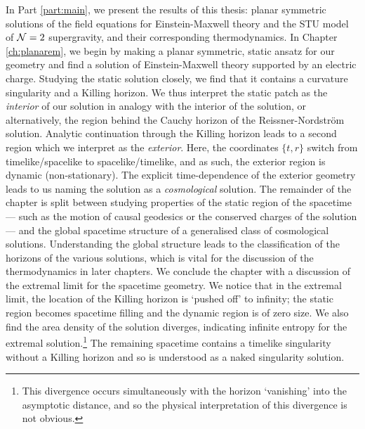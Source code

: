 In Part \ref{part:main}, we present the results of this thesis: planar symmetric solutions of the field equations for Einstein-Maxwell theory and the STU model of ${\cal N} = 2$ supergravity, and their corresponding thermodynamics. In Chapter \ref{ch:planarem}, we begin by making a planar symmetric, static ansatz for our geometry and find a solution of Einstein-Maxwell theory supported by an electric charge. Studying the static solution closely, we find that it contains a curvature singularity and a Killing horizon. We thus interpret the static patch as the \emph{interior} of our solution in analogy with the interior of the \sch solution, or alternatively, the region behind the Cauchy horizon of the Reissner-Nordstr\"om solution. Analytic continuation through the Killing horizon leads to a second region which we interpret as the \emph{exterior}. Here, the coordinates $\{t,r\}$ switch from timelike/spacelike to spacelike/timelike, and as such, the exterior region is dynamic (non-stationary). The explicit time-dependence of the exterior geometry leads to us naming the solution as a \emph{cosmological} solution. The remainder of the chapter is split between studying properties of the static region of the spacetime --- such as the motion of causal geodesics or the conserved charges of the solution --- and the global spacetime structure of a generalised class of cosmological solutions. Understanding the global structure leads to the classification of the horizons of the various solutions, which is vital for the discussion of the thermodynamics in later chapters. We conclude the chapter with a discussion of the extremal limit for the spacetime geometry. We notice that in the extremal limit, the location of the Killing horizon is `pushed off' to infinity; the static region becomes spacetime filling and the dynamic region is of zero size. We also find the area density of the solution diverges, indicating infinite entropy for the extremal solution.\footnote{This divergence occurs simultaneously with the horizon `vanishing' into the asymptotic distance, and so the physical interpretation of this divergence is not obvious.} The remaining spacetime contains a timelike singularity without a Killing horizon and so is understood as a naked singularity solution.

